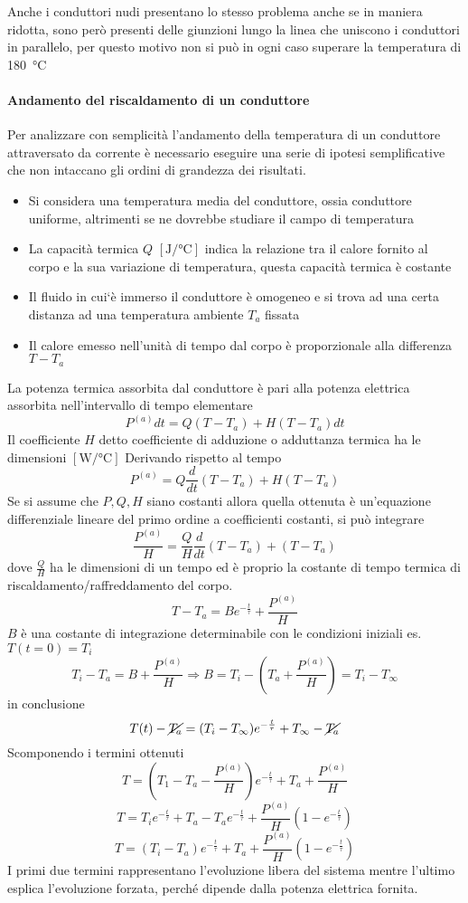 Anche i conduttori nudi presentano lo stesso problema anche se in maniera ridotta, sono però 
presenti delle giunzioni lungo la linea che uniscono i conduttori in parallelo, per questo
motivo non si può in ogni caso superare la temperatura di 
\SI{180}{\celsius}

\paragraph{Andamento del riscaldamento di un conduttore}
Per analizzare con semplicità l'andamento della temperatura di un conduttore attraversato
da corrente è necessario eseguire una serie di ipotesi semplificative che non intaccano
gli ordini di grandezza dei risultati.

\begin{itemize}
\item Si considera una temperatura media del conduttore, ossia conduttore uniforme,
altrimenti se ne dovrebbe studiare il campo di temperatura
\item La capacità termica $Q$ $[\si{\joule\per\celsius}]$ indica la relazione tra il calore 
fornito al corpo e la sua variazione di temperatura, questa capacità termica è costante
\item Il fluido in cui`è immerso il conduttore è omogeneo e si trova ad una certa distanza
ad una temperatura ambiente $T_a$ fissata
\item Il calore emesso nell'unità di tempo dal corpo è proporzionale alla differenza 
$T-T_a$
\end{itemize}

La potenza termica assorbita dal conduttore è pari alla potenza elettrica assorbita
nell'intervallo di tempo elementare
$$
P^{(a)} dt = Q(T-T_a) + H(T-T_a) dt
$$
Il coefficiente $H$ detto coefficiente di adduzione o adduttanza termica ha le dimensioni
$[\si{\watt\per\celsius}]$
Derivando rispetto al tempo
$$
P^{(a)} = Q \frac{d}{dt} (T-T_a) + H(T-T_a)
$$
Se si assume che $P, Q, H$ siano costanti allora quella ottenuta è un'equazione
differenziale lineare del primo ordine a coefficienti costanti, si può integrare 
$$
\frac{P^{(a)}}{H} = \frac{Q}{H} \frac{d}{dt} (T-T_a) + (T-T_a)
$$
dove $\frac{Q}{H}$ ha le dimensioni di un tempo ed è proprio la costante di tempo termica
di riscaldamento/raffreddamento del corpo.
$$
T-T_a = Be^{-\frac{t}{\tau}} + \frac{P^{(a)}}{H}
$$
$B$ è una costante di integrazione determinabile con le condizioni iniziali es.
$T(t=0) = T_i$
$$
T_i - T_a = B + \frac{P^{(a)}}{H} \Rightarrow B = T_i - \left(T_a + \frac{P^{(a)}}{H}\right) 
= T_i - T_\infty
$$
in conclusione
$$
T(t) - \cancel{T_a} = (T_i - T_\infty)e^{-\frac{t}{\tau}} + T_\infty - \cancel{T_a}
$$
Scomponendo i termini ottenuti
$$
T = \left(T_1-T_a-\frac{P^{(a)}}{H}\right)e^{-\frac{t}{\tau}} + T_a + \frac{P^{(a)}}{H} 
$$
$$
T = T_i e^{-\frac{t}{\tau}} + T_a - T_a e^{-\frac{t}{\tau}} + \frac{P^{(a)}}{H} 
\left(1 - e^{-\frac{t}{\tau}}\right)
$$
$$
T = (T_i - T_a)e^{-\frac{t}{\tau}} + T_a + \frac{P^{(a)}}{H} \left(1-e^{-\frac{t}{\tau}}\right)
$$
I primi due termini rappresentano l'evoluzione libera del sistema mentre l'ultimo esplica
l'evoluzione forzata, perché dipende dalla potenza elettrica fornita.

